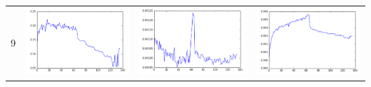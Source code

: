 \documentclass[14pt, a4paper]{extarticle}
\begin{document}
\begin{table}[!htb]
{\begin{tabular}{|c|c|c|c|}
\hline
9 & \includegraphics[scale=0.3]{images/ks_9.png} & \includegraphics[scale=0.3]{images/cvm_9.png} & \includegraphics[scale=0.3]{images/auc_9.png} \\

\end{tabular}}
\end{table}
\end{document}
